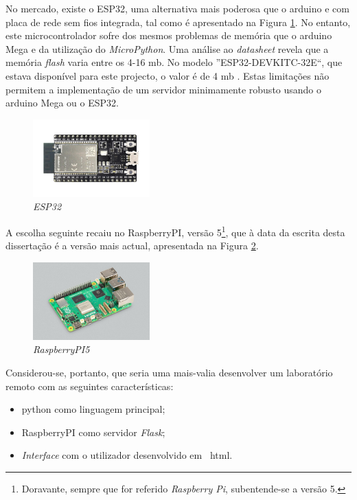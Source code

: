 No mercado, existe o \gls{ESP32}, uma alternativa mais poderosa que o \gls{arduino} e com placa de rede sem fios integrada, tal como é apresentado na Figura \ref{fig:ESP32}. No entanto, este microcontrolador sofre dos mesmos problemas de memória que o \gls{arduino} Mega e da utilização do \textit{MicroPython}. Uma análise ao \textit{datasheet} \cite{esp32datasheet} revela que a memória \textit{flash} varia entre os 4-16 \acrlong{mb}. No modelo ''ESP32-DEVKITC-32E``, que estava disponível para este projecto, o valor é de 4 \acrshort{mb} \cite{diferencaspython}. Estas limitações não permitem a implementação de um servidor minimamente robusto usando o \gls{arduino} Mega ou o \gls{ESP32}.

\begin{figure}[hbtp]
    \centering
    \includegraphics[width=0.4\textwidth]{figures/ESP32-DevKitC_L_0.png}
    \caption{\textit{ESP32} \cite{ESPDevKit}}
    \label{fig:ESP32}
\end{figure}

A escolha seguinte recaiu no \gls{RaspberryPI}, versão 5\footnote{Doravante, sempre que for referido \textit{Raspberry Pi}, subentende-se a versão 5.}, que à data da escrita desta dissertação é a versão mais actual, apresentada na Figura \ref{fig:Raspberrypi5}. 

\begin{figure}[hbtp]
    \centering
    \includegraphics[width=0.4\textwidth]{figures/raspberrypi5.jpg}
    \caption{\textit{RaspberryPI5} \cite{introRaspberrypi5}}
    \label{fig:Raspberrypi5}
\end{figure}

Considerou-se, portanto, que seria uma mais-valia desenvolver um \acrshort{laboratório remoto} com as seguintes características:
\begin{itemize}
    \item \gls{python} como linguagem principal;
    \item \gls{RaspberryPI} como servidor \textit{Flask};
    \item \textit{Interface} com o utilizador desenvolvido em ~\acrfull{html}.
\end{itemize}

